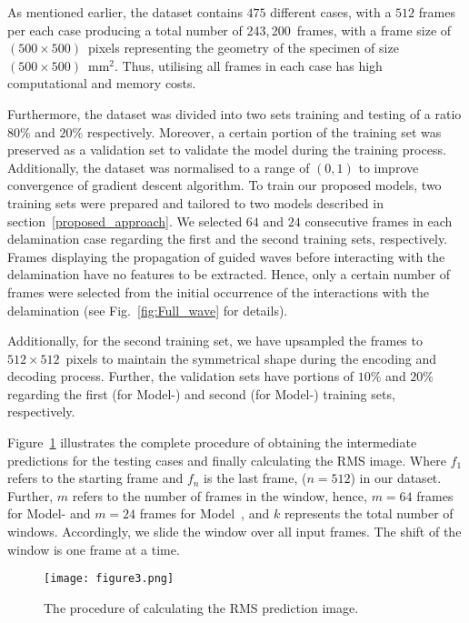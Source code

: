 As mentioned earlier, the dataset contains \(475\) different cases, with a \(512\) frames per each case producing a total number of 243,\,200~frames, with a frame size of \((500\times500)\)~pixels representing the geometry of the specimen of size \((500\times500)\)~mm\(^{2}\).
Thus, utilising all frames in each case has high computational and memory costs.

Furthermore, the dataset was divided into two sets training and testing of a ratio \(80\%\) and \(20\% \) respectively.
Moreover, a certain portion of the training set was preserved as a validation set to validate the model during the training process.
Additionally, the dataset was normalised to a range of \((0, 1)\) to improve convergence of gradient descent algorithm.
To train our proposed models, two training sets were prepared and tailored to two models described in section~\ref{proposed_approach}.
We selected \(64\) and \(24\) consecutive frames in each delamination case regarding the first and the second training sets, respectively.
Frames displaying the propagation of guided waves before interacting with the delamination have no features to be extracted.  
Hence, only a certain number of frames were selected from the initial occurrence of the interactions with the delamination (see Fig.~\ref{fig:Full_wave} for details).

Additionally, for the second training set, we have upsampled the frames to \(512\times512\)~pixels to maintain the symmetrical shape during the encoding and decoding process.
Further, the validation sets have portions of \(10\%\) and \(20\%\) regarding the first (for Model-) and second (for Model-) training sets, respectively.

Figure~\ref{fig:Diagram_exp_predictions} illustrates the complete procedure of obtaining the intermediate predictions for the testing cases and finally calculating the RMS image.
Where \(f_{1}\) refers to the starting frame and \(f_{n}\) is the last frame, (\(n=512\)) in our dataset.
Further, \(m\) refers to the number of frames in the window, hence, \(m=64\) frames for Model- and \(m=24\) frames for Model~, and \(k\) represents the total number of windows.
Accordingly, we slide the window over all input frames.
The shift of the window is one frame at a time.
\begin{figure}[!h]
	\centering
	\texttt{[image: figure3.png]}
	\caption{The procedure of calculating the RMS prediction image.}
	\label{fig:Diagram_exp_predictions}
\end{figure}
\newpage